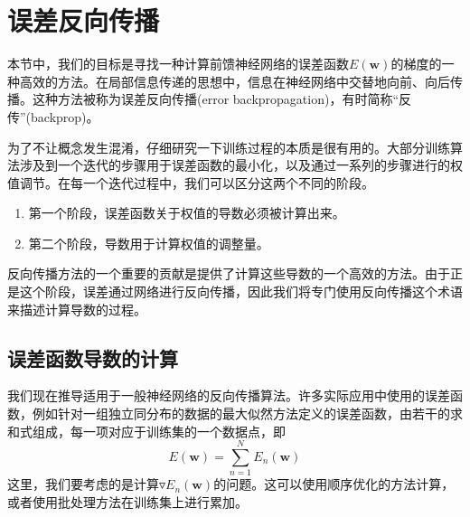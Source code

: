 \section{误差反向传播}
本节中，我们的目标是寻找一种计算前馈神经网络的误差函数$E(\boldsymbol{w})$的梯度的一种高效的方法。在局部信息传递的思想中，信息在神经网络中交替地向前、向后传播。这种方法被称为误差反向传播(error backpropagation)，有时简称“反传”(backprop)。

为了不让概念发生混淆，仔细研究一下训练过程的本质是很有用的。大部分训练算法涉及到一个迭代的步骤用于误差函数的最小化，以及通过一系列的步骤进行的权值调节。在每一个迭代过程中，我们可以区分这两个不同的阶段。
\begin{enumerate}
	\item 第一个阶段，误差函数关于权值的导数必须被计算出来。
	\item 第二个阶段，导数用于计算权值的调整量。
\end{enumerate}
反向传播方法的一个重要的贡献是提供了计算这些导数的一个高效的方法。由于正是这个阶段，误差通过网络进行反向传播，因此我们将专门使用反向传播这个术语来描述计算导数的过程。
\subsection*{误差函数导数的计算}
我们现在推导适用于一般神经网络的反向传播算法。许多实际应用中使用的误差函数，例如针对一组独立同分布的数据的最大似然方法定义的误差函数，由若干的求和式组成，每一项对应于训练集的一个数据点，即
\begin{equation}
	E(\boldsymbol{w})=\sum_{n=1}^{N}E_n(\boldsymbol{w})
\end{equation}
这里，我们要考虑的是计算$\triangledown E_n(\boldsymbol{w})$的问题。这可以使用顺序优化的方法计算，或者使用批处理方法在训练集上进行累加。


